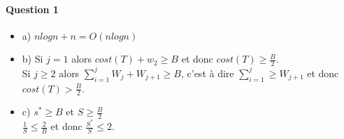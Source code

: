 \paragraph{Question 1}
\begin{itemize}
\item a) $nlogn+n = O(nlogn)$
\item b) Si $j = 1$ alors $cost(T) + w_{2} \geqslant B$ et donc $cost(T) \geqslant \frac{B}{2}$.\\
Si $j \geqslant 2$ alors $\sum_{i=1}^{j} W_{j} + W_{j+1} \geqslant B$, c'est à dire $\sum_{i=1}^{j} \geqslant W_{j+1}$ et donc $cost(T) > \frac{B}{2}$.
\item c)  $s^{*} \geqslant B$ et $S \geqslant \frac{B}{2}$\\
$\frac{1}{S} \leqslant \frac{2}{B}$ et donc $\frac{S^{*}}{S} \leqslant 2$.
\end{itemize}

